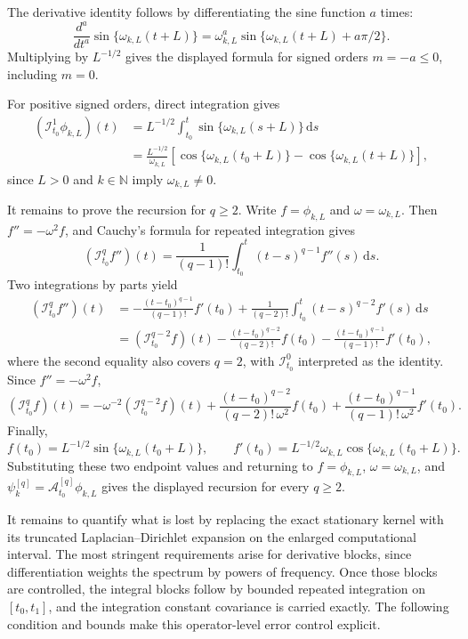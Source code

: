 \documentclass[11pt,a4paper]{article}
\theoremstyle{definition}
\theoremstyle{remark}
\begin{document}
\begin{mainproof}
The derivative identity follows by differentiating the sine function \(a\) times:
\[
\frac{d^a}{dt^a}\sin\{\omega_{k,L}(t+L)\}
=
\omega_{k,L}^{a}\sin\{\omega_{k,L}(t+L)+a\pi/2\}.
\]
Multiplying by \(L^{-1/2}\) gives the displayed formula for signed orders \(m=-a\le0\), including \(m=0\).

For positive signed orders, direct integration gives
\begin{align*}
(\mathcal I_{t_0}^{1}\phi_{k,L})(t)
&=
L^{-1/2}\int_{t_0}^t \sin\{\omega_{k,L}(s+L)\}\,\mathrm ds\\
&=
\frac{L^{-1/2}}{\omega_{k,L}}
\left[
\cos\{\omega_{k,L}(t_0+L)\}-\cos\{\omega_{k,L}(t+L)\}
\right],
\end{align*}
since \(L>0\) and \(k\in\mathbb N\) imply \(\omega_{k,L}\neq0\).

It remains to prove the recursion for \(q\ge2\). Write \(f=\phi_{k,L}\) and \(\omega=\omega_{k,L}\). Then \(f''=-\omega^2 f\), and Cauchy's formula for repeated integration gives
\[
(\mathcal I_{t_0}^q f'')(t)
=
\frac{1}{(q-1)!}\int_{t_0}^t (t-s)^{q-1}f''(s)\,\mathrm ds.
\]
Two integrations by parts yield
\begin{align*}
(\mathcal I_{t_0}^q f'')(t)
&=
-\frac{(t-t_0)^{q-1}}{(q-1)!}f'(t_0)
+
\frac{1}{(q-2)!}\int_{t_0}^t (t-s)^{q-2}f'(s)\,\mathrm ds\\
&=
(\mathcal I_{t_0}^{q-2}f)(t)
-
\frac{(t-t_0)^{q-2}}{(q-2)!}f(t_0)
-
\frac{(t-t_0)^{q-1}}{(q-1)!}f'(t_0),
\end{align*}
where the second equality also covers \(q=2\), with \(\mathcal I_{t_0}^0\) interpreted as the identity. Since \(f''=-\omega^2 f\),
\[
(\mathcal I_{t_0}^q f)(t)
=
-\omega^{-2}(\mathcal I_{t_0}^{q-2}f)(t)
+
\frac{(t-t_0)^{q-2}}{(q-2)!\,\omega^2}f(t_0)
+
\frac{(t-t_0)^{q-1}}{(q-1)!\,\omega^2}f'(t_0).
\]
Finally,
\[
f(t_0)=L^{-1/2}\sin\{\omega_{k,L}(t_0+L)\},
\qquad
f'(t_0)=L^{-1/2}\omega_{k,L}\cos\{\omega_{k,L}(t_0+L)\}.
\]
Substituting these two endpoint values and returning to \(f=\phi_{k,L}\), \(\omega=\omega_{k,L}\), and \(\psi_k^{[q]}=\mathcal A_{t_0}^{[q]}\phi_{k,L}\) gives the displayed recursion for every \(q\ge2\).
\end{mainproof}


It remains to quantify what is lost by replacing the exact stationary kernel with its truncated Laplacian--Dirichlet expansion on the enlarged computational interval. The most stringent requirements arise for derivative blocks, since differentiation weights the spectrum by powers of frequency. Once those blocks are controlled, the integral blocks follow by bounded repeated integration on \([t_0,t_1]\), and the integration constant covariance is carried exactly. The following condition and bounds make this operator-level error control explicit.
\end{document}
